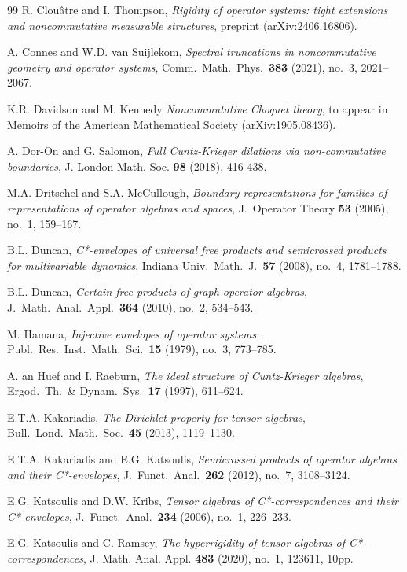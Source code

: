 \documentclass[11pt, draft]{amsart}
\numberwithin{equation}{section}
\theoremstyle{plain}
\theoremstyle{definition}
\theoremstyle{remark}
\begin{document}
\begin{thebibliography}{99}
 R. Clou{\^a}tre and I. Thompson,
\textit{Rigidity of operator systems: tight extensions and noncommutative measurable structures},
preprint (arXiv:2406.16806).

 A. Connes and W.D. van Suijlekom,
\textit{Spectral truncations in noncommutative geometry and operator systems},
Comm.\ Math.\ Phys.\ \textbf{383} (2021), no.\ 3, 2021--2067.

 K.R. Davidson and M. Kennedy 
\textit{Noncommutative Choquet theory}, to appear in Memoirs of the American Mathematical Society (arXiv:1905.08436).

 A. Dor-On and G. Salomon,
\textit{Full Cuntz-Krieger dilations via non-commutative boundaries},
J. London Math. Soc. \textbf{98} (2018), 416-438.

 M.A. Dritschel and S.A. McCullough,
\textit{Boundary representations for families of representations of operator algebras and spaces}, 
J.\ Operator Theory \textbf{53} (2005), no.\ 1, 159--167.

 B.L. Duncan,
\textit{C*-envelopes of universal free products and semicrossed products for multivariable dynamics}, 
Indiana Univ.\ Math.\ J.\ \textbf{57} (2008), no.\ 4, 1781--1788.

 B.L. Duncan,
\textit{Certain free products of graph operator algebras}, 
J.\ Math.\ Anal.\ Appl.\ \textbf{364} (2010), no.\ 2, 534--543.

 M. Hamana,
\textit{Injective envelopes of operator systems},
Publ.\ Res.\ Inst.\ Math.\ Sci.\ \textbf{15} (1979), no.\ 3, 773--785.

 A. an Huef and I. Raeburn, 
\textit{The ideal structure of Cuntz-Krieger algebras}, 
Ergod.\ Th.\ \& Dynam.\ Sys.\ \textbf{17} (1997), 611--624.

 E.T.A. Kakariadis,
\textit{The Dirichlet property for tensor algebras},
Bull.\ Lond.\ Math.\ Soc.\ \textbf{45} (2013), 1119--1130. 

 E.T.A. Kakariadis and E.G. Katsoulis,
\textit{Semicrossed products of operator algebras and their C*-envelopes},
J.\ Funct.\ Anal.\ \textbf{262} (2012), no.\ 7, 3108--3124. 

 E.G. Katsoulis and D.W. Kribs, 
\textit{Tensor algebras of C*-correspondences and their C*-envelopes}, 
J.\ Funct.\ Anal.\ \textbf{234} (2006), no.\ 1, 226--233.

 E.G. Katsoulis and C. Ramsey,
\textit{The hyperrigidity of tensor algebras of C*-correspondences},
J. Math. Anal. Appl. \textbf{483} (2020), no.\ 1, 123611, 10pp.


\end{thebibliography}
\end{document}
